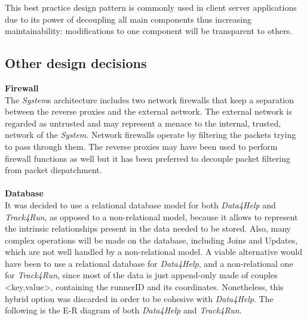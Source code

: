 \documentclass[titlepage]{article}
\begin{document}
	This best practice design pattern is commonly used in client server applications due to its power of decoupling all main components thus increasing maintainability: modifications to one component will be transparent to others.
	\pagebreak
	
	
	\subsection{Other design decisions}
	
	{\bf Firewall}\\
	The {\it System}s architecture includes two network firewalls that keep a separation between the reverse proxies and the external network. The external network is regarded as untrusted and may represent a menace to the internal, trusted, network of the {\it System}.
	Network firewalls operate by filtering the packets trying to pass through them.
	The reverse proxies may have been used to perform firewall functions as well but it has been preferred to decouple packet filtering from packet dispatchment.\\ \\
	{\bf Database}\\
	It was decided to use a relational database model for both {\it Data4Help} and {\it Track4Run}, as opposed to a non-relational model, because it allows to represent the intrinsic relationships present in the data needed to be stored. Also, many complex operations will be made on the database, including Joins and Updates, which are not well handled by a non-relational model. 
	A viable alternative would have been to use a relational database for {\it Data4Help}, and a non-relational one for {\it Track4Run}, since most of the data is just append-only made of couples <key,value>, containing the runnerID and its coordinates. Nonetheless, this hybrid option was discarded in order to be cohesive with {\it Data4Help}.
	The following is the E-R diagram of both {\it Data4Help} and {\it Track4Run}.
	
\end{document}
